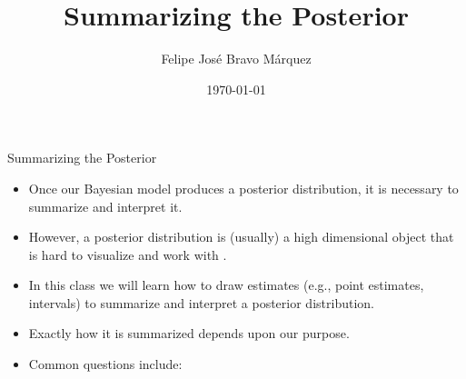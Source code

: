 \documentclass[handout]{beamer}
\title{Summarizing the Posterior}
\author[Felipe Bravo Márquez]{\footnotesize
 \textcolor[rgb]{0.00,0.00,1.00}{Felipe José Bravo Márquez}}
\date{ \today }
\begin{document}
\begin{frame}
\titlepage


\end{frame}




\begin{frame}{Summarizing the Posterior}
\scriptsize{
\begin{itemize}

\item Once our Bayesian model produces a posterior distribution, it is necessary to summarize and interpret it.

\item However, a posterior distribution is (usually) a high dimensional object that is hard to visualize and work with \cite{pml1Book}.

\item In this class we will learn how to draw estimates (e.g., point estimates, intervals) to summarize and interpret a posterior distribution.



\item Exactly how it is summarized depends upon our purpose.

\item Common questions include:
\begin{itemize}
\end{itemize}
 
\end{itemize}



} 

\end{frame}
\end{document}
